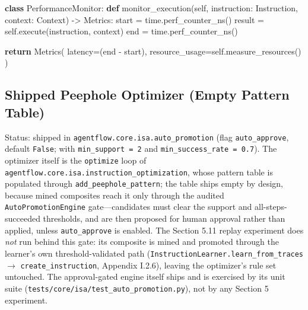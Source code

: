 \documentclass[
  11pt,
]{article}
\newenvironment{Shaded}{}{}
\newcommand{\ControlFlowTok}[1]{\textcolor[rgb]{0.00,0.44,0.13}{\textbf{#1}}}
\newcommand{\KeywordTok}[1]{\textcolor[rgb]{0.00,0.44,0.13}{\textbf{#1}}}
\newcommand{\NormalTok}[1]{#1}
\newcommand{\OperatorTok}[1]{\textcolor[rgb]{0.40,0.40,0.40}{#1}}
\newcommand{\VariableTok}[1]{\textcolor[rgb]{0.10,0.09,0.49}{#1}}
\begin{document}
\begin{Shaded}
\begin{Highlighting}[]
\KeywordTok{class}\NormalTok{ PerformanceMonitor:}
    \KeywordTok{def}\NormalTok{ monitor\_execution(}\VariableTok{self}\NormalTok{, }
\NormalTok{                         instruction: Instruction, }
\NormalTok{                         context: Context) }\OperatorTok{{-}\textgreater{}}\NormalTok{ Metrics:}
\NormalTok{        start }\OperatorTok{=}\NormalTok{ time.perf\_counter\_ns()}
\NormalTok{        result }\OperatorTok{=} \VariableTok{self}\NormalTok{.execute(instruction, context)}
\NormalTok{        end }\OperatorTok{=}\NormalTok{ time.perf\_counter\_ns()}
        
        \ControlFlowTok{return}\NormalTok{ Metrics(}
\NormalTok{            latency}\OperatorTok{=}\NormalTok{(end }\OperatorTok{{-}}\NormalTok{ start),}
\NormalTok{            resource\_usage}\OperatorTok{=}\VariableTok{self}\NormalTok{.measure\_resources()}
\NormalTok{        )}
\end{Highlighting}
\end{Shaded}

\subsection{Shipped Peephole Optimizer (Empty Pattern
Table)}\label{shipped-peephole-optimizer-empty-pattern-table}

Status: shipped in \texttt{agentflow.core.isa.auto\_promotion} (flag
\texttt{auto\_approve}, default \texttt{False}; with
\texttt{min\_support\ =\ 2} and \texttt{min\_success\_rate\ =\ 0.7}).
The optimizer itself is the \texttt{optimize} loop of
\texttt{agentflow.core.isa.instruction\_optimization}, whose pattern
table is populated through \texttt{add\_peephole\_pattern}; the table
ships empty by design, because mined composites reach it only through
the audited \texttt{AutoPromotionEngine} gate---candidates must clear
the support and all-steps-succeeded thresholds, and are then proposed
for human approval rather than applied, unless \texttt{auto\_approve} is
enabled. The Section 5.11 replay experiment does \emph{not} run behind
this gate: its composite is mined and promoted through the learner's own
threshold-validated path
(\texttt{InstructionLearner.learn\_from\_traces} \(\rightarrow\)
\texttt{create\_instruction}, Appendix I.2.6), leaving the optimizer's
rule set untouched. The approval-gated engine itself ships and is
exercised by its unit suite
(\texttt{tests/core/isa/test\_auto\_promotion.py}), not by any Section 5
experiment.
\end{document}

